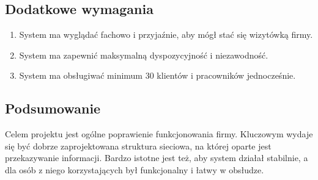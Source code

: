   \subsection{Dodatkowe wymagania}
      \begin{enumerate}
        \item System ma wyglądać fachowo i przyjaźnie, aby mógł stać się wizytówką firmy.
        \item System ma zapewnić maksymalną dyspozycyjność i niezawodność.
        \item System ma obsługiwać minimum 30 klientów i pracowników jednocześnie.
      \end{enumerate}
  \subsection{Podsumowanie}
      Celem projektu jest ogólne poprawienie funkcjonowania firmy.
      Kluczowym wydaje się być dobrze zaprojektowana struktura sieciowa, na której oparte jest przekazywanie informacji.
      Bardzo istotne jest też, aby system działał stabilnie, a dla osób z niego korzystających był funkcjonalny i łatwy w obsłudze.
